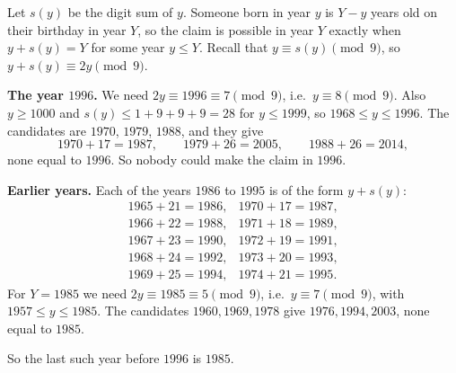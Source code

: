 Let $s(y)$ be the digit sum of $y$. Someone born in year $y$ is $Y-y$ years old on their birthday in year $Y$, so the claim is possible in year $Y$ exactly when $y+s(y)=Y$ for some year $y\le Y$. Recall that $y\equiv s(y)\pmod9$, so $y+s(y)\equiv2y\pmod9$.

\textbf{The year $1996$.} We need $2y\equiv1996\equiv7\pmod9$, i.e.\ $y\equiv8\pmod9$. Also $y\ge1000$ and $s(y)\le1+9+9+9=28$ for $y\le1999$, so $1968\le y\le1996$. The candidates are $1970$, $1979$, $1988$, and they give
\[
1970+17=1987,\qquad 1979+26=2005,\qquad 1988+26=2014,
\]
none equal to $1996$. So nobody could make the claim in $1996$.

\textbf{Earlier years.} Each of the years $1986$ to $1995$ is of the form $y+s(y)$:
\[
\begin{array}{ll}
1965+21=1986, & 1970+17=1987,\\
1966+22=1988, & 1971+18=1989,\\
1967+23=1990, & 1972+19=1991,\\
1968+24=1992, & 1973+20=1993,\\
1969+25=1994, & 1974+21=1995.
\end{array}
\]
For $Y=1985$ we need $2y\equiv1985\equiv5\pmod9$, i.e.\ $y\equiv7\pmod9$, with $1957\le y\le1985$. The candidates $1960,1969,1978$ give $1976,1994,2003$, none equal to $1985$.

So the last such year before $1996$ is $\boxed{1985}$.

